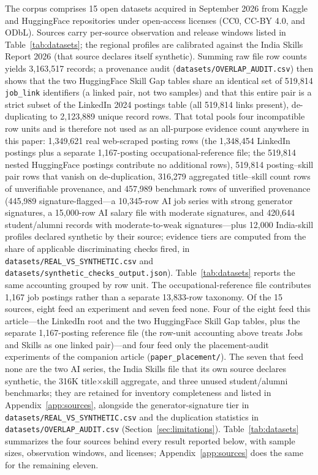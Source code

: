 \documentclass[journal]{IEEEtran}
\begin{document}
The corpus comprises 15 open datasets acquired in September 2026 from Kaggle and HuggingFace repositories under open-access licenses (CC0, CC-BY 4.0, and ODbL). Sources carry per-source observation and release windows listed in Table~\ref{tab:datasets}; the regional profiles are calibrated against the India Skills Report 2026 (that source declares itself synthetic). Summing raw file row counts yields 3,163,517 records; a provenance audit (\texttt{datasets/OVERLAP\_AUDIT.csv}) then shows that the two HuggingFace Skill Gap tables share an identical set of 519,814 \texttt{job\_link} identifiers (a linked pair, not two samples) and that this entire pair is a strict subset of the LinkedIn 2024 postings table (all 519,814 links present), de-duplicating to 2,123,889 unique record rows. That total pools four incompatible row units and is therefore not used as an all-purpose evidence count anywhere in this paper: 1,349,621 real web-scraped posting rows (the 1,348,454 LinkedIn postings plus a separate 1,167-posting occupational-reference file; the 519,814 nested HuggingFace postings contribute no additional rows), 519,814 posting--skill pair rows that vanish on de-duplication, 316,279 aggregated title--skill count rows of unverifiable provenance, and 457,989 benchmark rows of unverified provenance (445,989 signature-flagged---a 10,345-row AI job series with strong generator signatures, a 15,000-row AI salary file with moderate signatures, and 420,644 student/alumni records with moderate-to-weak signatures---plus 12,000 India-skill profiles declared synthetic by their source; evidence tiers are computed from the share of applicable discriminating checks fired, in \texttt{datasets/REAL\_VS\_SYNTHETIC.csv} and \texttt{datasets/synthetic\_checks\_output.json}). Table~\ref{tab:datasets} reports the same accounting grouped by row unit. The occupational-reference file contributes 1,167 job postings rather than a separate 13,833-row taxonomy. Of the 15 sources, eight feed an experiment and seven feed none. Four of the eight feed this article---the LinkedIn root and the two HuggingFace Skill Gap tables, plus the separate 1,167-posting reference file (the row-unit accounting above treats Jobs and Skills as one linked pair)---and four feed only the placement-audit experiments of the companion article (\texttt{paper\_placement/}). The seven that feed none are the two AI series, the India Skills file that its own source declares synthetic, the 316K title$\times$skill aggregate, and three unused student/alumni benchmarks; they are retained for inventory completeness and listed in Appendix~\ref{app:sources}, alongside the generator-signature tier in \texttt{datasets/REAL\_VS\_SYNTHETIC.csv} and the duplication statistics in \texttt{datasets/OVERLAP\_AUDIT.csv} (Section~\ref{sec:limitations}). Table~\ref{tab:datasets} summarizes the four sources behind every result reported below, with sample sizes, observation windows, and licenses; Appendix~\ref{app:sources} does the same for the remaining eleven.
\end{document}
